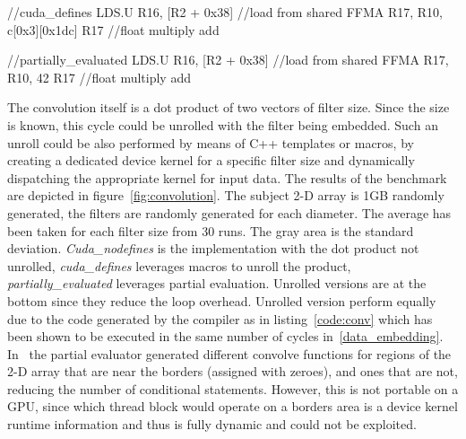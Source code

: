 \begin{listing}
    
\begin{pyglist}[language=C,label=code:conv,caption=Convolution partial evaluation]
//cuda_defines
LDS.U R16, [R2 + 0x38] //load from shared
FFMA R17, R10, c[0x3][0x1dc] R17 //float multiply add

//partially_evaluated
LDS.U R16, [R2 + 0x38] //load from shared
FFMA R17, R10, 42 R17 //float multiply add

\end{pyglist}
\end{listing}

The convolution itself is a dot product of two vectors of filter size. 
Since the size is known, this cycle could be unrolled with the filter being 
embedded. %
Such an unroll could be also performed by means of C++ templates or macros, by creating a dedicated device kernel for a specific filter size and dynamically dispatching the appropriate kernel for input data. The results of the benchmark are depicted in figure~\ref{fig:convolution}. The subject 2-D array is 1GB randomly generated, the filters are randomly generated for each diameter. The average has been taken for each filter size from 30 runs. The gray area is the standard deviation. \emph{Cuda\_nodefines} is the implementation with the dot product not unrolled, \emph{cuda\_defines} leverages macros to unroll the product, \emph{partially\_evaluated} leverages partial evaluation. Unrolled versions are at the bottom since they reduce the loop overhead. Unrolled version perform equally due to the code generated by the compiler as in listing~\ref{code:conv} which has been shown to be executed in the same number of cycles in~\ref{data_embedding}.
In~\cite{OnlinePe} the partial evaluator generated different convolve functions for regions of the 2-D array that are near the borders (assigned with zeroes), and ones that are not, reducing the number of conditional statements. However, this is not portable on a GPU, since which thread block would operate on a borders area is a device kernel runtime information and thus is fully dynamic and could not be exploited.



